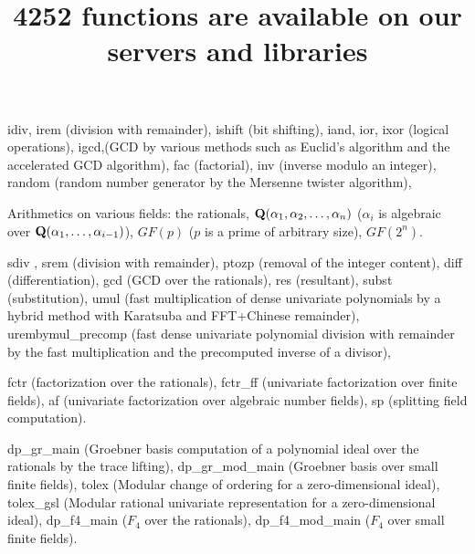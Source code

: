 \documentclass[twocolumn]{article}
\title{\huge \color{blue} 4252 functions are available
on our servers and libraries}
\author{} \date{}
\begin{document}
\maketitle

\noindent
{}

\noindent
{\color{red} idiv},{\color{red} irem} (division with remainder),
{\color{red} ishift} (bit shifting),
{\color{red} iand},{\color{red} ior},{\color{red} ixor} (logical operations),
{\color{red} igcd},(GCD by various methods such as Euclid's algorithm and
the accelerated GCD algorithm),
{\color{red} fac} (factorial),
{\color{red} inv} (inverse modulo an integer),
{\color{red} random} (random number generator by the Mersenne twister algorithm),



\medbreak

\noindent
{}

\noindent
Arithmetics on various fields: the rationals, 
${\bf Q}(\alpha_1,\alpha_2,\ldots,\alpha_n)$
($\alpha_i$ is algebraic over ${\bf Q}(\alpha_1,\ldots,\alpha_{i-1})$),
$GF(p)$ ($p$ is a prime of arbitrary size), $GF(2^n)$.

\medbreak

\noindent
{}

\noindent
{\color{red} sdiv }, {\color{red} srem } (division with remainder),
{\color{red} ptozp } (removal of the integer content),
{\color{red} diff } (differentiation),
{\color{red} gcd } (GCD over the rationals),
{\color{red} res } (resultant),
{\color{red} subst } (substitution),
{\color{red} umul} (fast multiplication of dense univariate polynomials 
by a hybrid method with Karatsuba and FFT+Chinese remainder),
{\color{red} urembymul\_precomp} (fast dense univariate polynomial 
division with remainder by the fast multiplication and 
the precomputed inverse of a divisor),

\noindent
{}
{\color{red} fctr } (factorization over the rationals),
{\color{red} fctr\_ff } (univariate factorization over finite fields),
{\color{red} af } (univariate factorization over algebraic number fields),
{\color{red} sp} (splitting field computation).

\medbreak

\noindent
{} 

\noindent
{\color{red} dp\_gr\_main } (Groebner basis computation of a polynomial ideal 
over the rationals by the trace lifting),
{\color{red} dp\_gr\_mod\_main } (Groebner basis over small finite fields),
{\color{red} tolex } (Modular change of ordering for a zero-dimensional ideal),
{\color{red} tolex\_gsl } (Modular rational univariate representation 
for a zero-dimensional ideal),
{\color{red} dp\_f4\_main } ($F_4$ over the rationals),
{\color{red} dp\_f4\_mod\_main } ($F_4$ over small finite fields).
\end{document}
